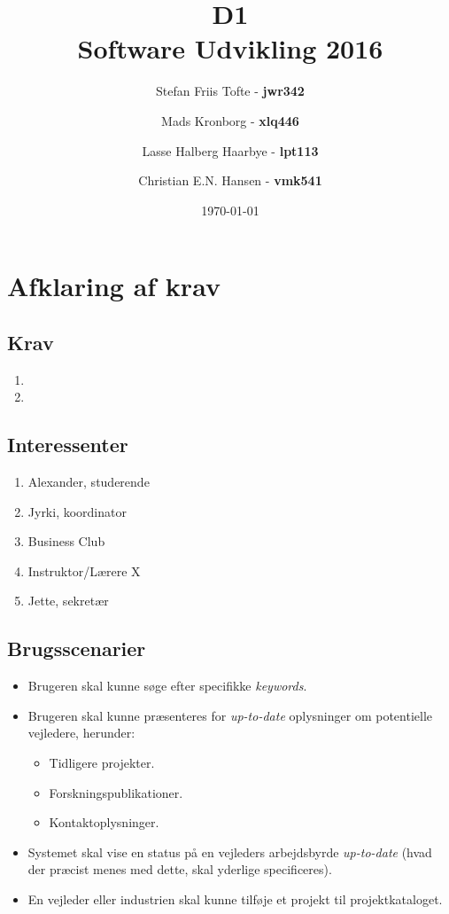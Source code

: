 \documentclass[11pt]{article}
\title{
  \vspace{3cm}
  \Huge{D1} \\
  \Large{Software Udvikling 2016}
}
\author{
	\Large{Stefan Friis Tofte} - \textbf{jwr342}%
	\and
	\Large{Mads Kronborg} - \textbf{xlq446}%
	\and
	\Large{Lasse Halberg Haarbye} - \textbf{lpt113}%
	\and
	\Large{Christian E.N. Hansen} - \textbf{vmk541}%
}
\date{
    \today
}
\def \ColourPDF {../include/ku-farve}
\def \TitlePDF {../include/ku-en}  %
\begin{document}


\clearpage\maketitle
\thispagestyle{empty}

\newpage
\tableofcontents
\newpage
\section{Afklaring af krav}
\subsection{Krav}
\begin{enumerate}
\item
\item
\end{enumerate}
\subsection{Interessenter}
\begin{enumerate}
\item Alexander, studerende
\item Jyrki, koordinator
\item Business Club
\item Instruktor/Lærere X
\item Jette, sekretær
\end{enumerate}
\subsection{Brugsscenarier}

\begin{itemize}
  \item Brugeren skal kunne søge efter specifikke \textit{keywords}.
  \item Brugeren skal kunne præsenteres for \textit{up-to-date} oplysninger om potentielle vejledere, herunder:
  \begin{itemize}
    \item Tidligere projekter.
    \item Forskningspublikationer.
    \item Kontaktoplysninger.
  \end{itemize}
  \item Systemet skal vise en status på en vejleders arbejdsbyrde \textit{up-to-date} (hvad der præcist menes med dette, skal yderlige specificeres).
  \item En vejleder eller industrien skal kunne tilføje et projekt til projektkataloget.
\end{itemize}
\end{document}
